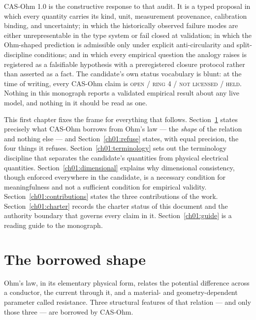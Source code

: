 CAS-Ohm 1.0 is the constructive response to that audit. It is a typed proposal in which every quantity carries its kind, unit, measurement provenance, calibration binding, and uncertainty; in which the historically observed failure modes are either unrepresentable in the type system or fail closed at validation; in which the Ohm-shaped prediction is admissible only under explicit anti-circularity and split-discipline conditions; and in which every empirical question the analogy raises is registered as a falsifiable hypothesis with a preregistered closure protocol rather than asserted as a fact. The candidate's own status vocabulary is blunt: at the time of writing, every CAS-Ohm claim is \textsc{open / ring 4 / not licensed / held}. Nothing in this monograph reports a validated empirical result about any live model, and nothing in it should be read as one.

This first chapter fixes the frame for everything that follows. Section~\ref{ch01:borrow} states precisely what CAS-Ohm borrows from Ohm's law --- the \emph{shape} of the relation and nothing else --- and Section~\ref{ch01:refuse} states, with equal precision, the four things it refuses. Section~\ref{ch01:terminology} sets out the terminology discipline that separates the candidate's quantities from physical electrical quantities. Section~\ref{ch01:dimensional} explains why dimensional consistency, though enforced everywhere in the candidate, is a necessary condition for meaningfulness and not a sufficient condition for empirical validity. Section~\ref{ch01:contributions} states the three contributions of the work. Section~\ref{ch01:charter} records the charter status of this document and the authority boundary that governs every claim in it. Section~\ref{ch01:guide} is a reading guide to the monograph.

\section{The borrowed shape}\label{ch01:borrow}

Ohm's law, in its elementary physical form, relates the potential difference across a conductor, the current through it, and a material- and geometry-dependent parameter called resistance. Three structural features of that relation --- and only those three --- are borrowed by CAS-Ohm.

